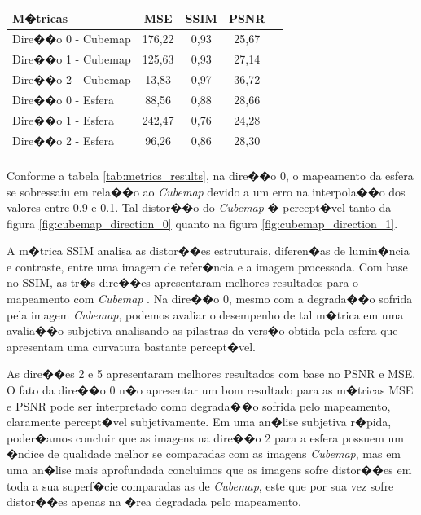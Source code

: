 \documentclass[12pt]{article}
\begin{document}
\begin{tabular}{l*{3}{c}r}
M�tricas          & MSE & SSIM & PSNR \\
\hline
Dire��o 0 - Cubemap & 176,22 & 0,93 & 25,67 \\
Dire��o 1 - Cubemap & 125,63 & 0,93 & 27,14 \\
Dire��o 2 - Cubemap & 13,83 & 0,97 & 36,72 \\
Dire��o 0 - Esfera  & 88,56 & 0,88 & 28,66 \\
Dire��o 1 - Esfera  & 242,47 & 0,76 & 24,28 \\
Dire��o 2 - Esfera  & 96,26 & 0,86 & 28,30 \\
\label{tab:metrics_results}
\end{tabular}

Conforme a tabela \ref{tab:metrics_results}, na dire��o 0, o mapeamento da esfera se sobressaiu em rela��o ao \textit{Cubemap} devido a um erro na interpola��o dos valores entre 0.9 e 0.1. Tal distor��o do \textit{Cubemap} � percept�vel tanto da figura \ref{fig:cubemap_direction_0} quanto na figura \ref{fig:cubemap_direction_1}.

A m�trica SSIM analisa as distor��es estruturais, diferen�as de lumin�ncia e contraste, entre uma imagem de refer�ncia e a imagem processada. Com base no SSIM, as tr�s dire��es apresentaram melhores resultados para o mapeamento com \textit{Cubemap}
. Na dire��o $0$, mesmo com a degrada��o sofrida pela imagem \textit{Cubemap}, podemos avaliar o desempenho de tal m�trica em uma avalia��o subjetiva analisando as pilastras da vers�o obtida pela esfera que apresentam uma curvatura bastante percept�vel.

As dire��es 2 e 5 apresentaram melhores resultados com base no PSNR e MSE. O fato da dire��o 0 n�o apresentar um bom resultado para as m�tricas MSE e PSNR pode ser interpretado como degrada��o sofrida pelo mapeamento, claramente percept�vel subjetivamente. Em uma an�lise subjetiva r�pida, poder�amos concluir que as imagens na dire��o 2 para a esfera possuem um �ndice de qualidade melhor se comparadas com as imagens \textit{Cubemap}, mas em uma an�lise mais aprofundada concluimos que as imagens sofre distor��es em toda a sua superf�cie comparadas as de \textit{Cubemap}, este que por sua vez sofre distor��es apenas na �rea degradada pelo mapeamento.
\end{document}

